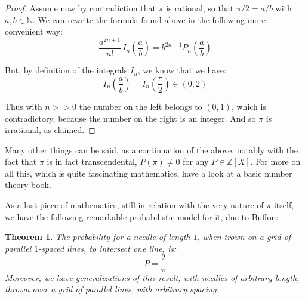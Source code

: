 \documentclass[12pt]{amsbook}
\newtheorem{theorem}{Theorem}[chapter]
\begin{document}
\begin{proof}
Assume now by contradiction that $\pi$ is rational, so that $\pi/2=a/b$ with $a,b\in\mathbb N$. We can rewrite the formula found above in the following more convenient way:
$$\frac{a^{2n+1}}{n!}\,I_n\left(\frac{a}{b}\right)=b^{2n+1}P_n\left(\frac{a}{b}\right)$$

But, by definition of the integrals $I_n$, we know that we have:
$$I_n\left(\frac{a}{b}\right)=I_n\left(\frac{\pi}{2}\right)\in(0,2)$$

Thus with $n>>0$ the number on the left belongs to $(0,1)$, which is contradictory, because the number on the right is an integer. And so $\pi$ is irrational, as claimed.
\end{proof}

Many other things can be said, as a continuation of the above, notably with the fact that $\pi$ is in fact transcendental, $P(\pi)\neq0$ for any $P\in\mathbb Z[X]$. For more on all this, which is quite fascinating mathematics, have a look at a basic number theory book.

\bigskip

As a last piece of mathematics, still in relation with the very nature of $\pi$ itself, we have the following remarkable probabilistic model for it, due to Buffon:

\begin{theorem}
The probability for a needle of length $1$, when trown on a grid of parallel $1$-spaced lines, to intersect one line, is:
$$P=\frac{2}{\pi}$$
Moreover, we have generalizations of this result, with needles of arbitrary length, thrown over a grid of parallel lines, with arbitrary spacing.
\end{theorem}
\end{document}
